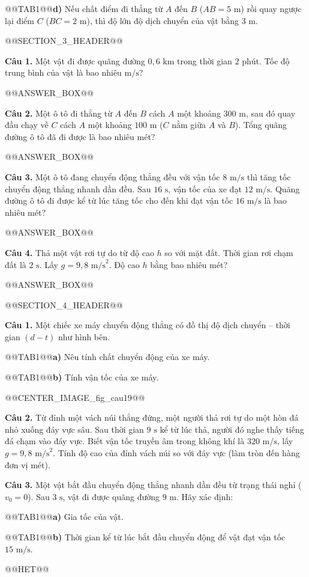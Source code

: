 \documentclass{article}
\begin{document}
@@TAB1@@\textbf{d)} Nếu chất điểm đi thẳng từ $A$ đến $B$ ($AB = 5\text{ m}$) rồi quay ngược lại điểm $C$ ($BC = 2\text{ m}$), thì độ lớn độ dịch chuyển của vật bằng $3\text{ m}$.

@@SECTION_3_HEADER@@

\textbf{Câu 1.} Một vật đi được quãng đường $0{,}6\text{ km}$ trong thời gian $2\text{ phút}$. Tốc độ trung bình của vật là bao nhiêu $\text{m/s}$?

@@ANSWER_BOX@@

\textbf{Câu 2.} Một ô tô đi thẳng từ $A$ đến $B$ cách $A$ một khoảng $300\text{ m}$, sau đó quay đầu chạy về $C$ cách $A$ một khoảng $100\text{ m}$ ($C$ nằm giữa $A$ và $B$). Tổng quãng đường ô tô đã đi được là bao nhiêu mét?

@@ANSWER_BOX@@

\textbf{Câu 3.} Một ô tô đang chuyển động thẳng đều với vận tốc $8\text{ m/s}$ thì tăng tốc chuyển động thẳng nhanh dần đều. Sau $16\text{ s}$, vận tốc của xe đạt $12\text{ m/s}$. Quãng đường ô tô đi được kể từ lúc tăng tốc cho đến khi đạt vận tốc $16\text{ m/s}$ là bao nhiêu mét?

@@ANSWER_BOX@@

\textbf{Câu 4.} Thả một vật rơi tự do từ độ cao $h$ so với mặt đất. Thời gian rơi chạm đất là $2\text{ s}$. Lấy $g = 9{,}8\text{ m/s}^2$. Độ cao $h$ bằng bao nhiêu mét?

@@ANSWER_BOX@@

@@SECTION_4_HEADER@@

\textbf{Câu 1.} Một chiếc xe máy chuyển động thẳng có đồ thị độ dịch chuyển -- thời gian $(d - t)$ như hình bên.

@@TAB1@@\textbf{a)} Nêu tính chất chuyển động của xe máy.

@@TAB1@@\textbf{b)} Tính vận tốc của xe máy.

@@CENTER_IMAGE_fig_cau19@@

\textbf{Câu 2.} Từ đỉnh một vách núi thẳng đứng, một người thả rơi tự do một hòn đá nhỏ xuống đáy vực sâu. Sau thời gian $9\text{ s}$ kể từ lúc thả, người đó nghe thấy tiếng đá chạm vào đáy vực. Biết vận tốc truyền âm trong không khí là $320\text{ m/s}$, lấy $g = 9{,}8\text{ m/s}^2$. Tính độ cao của đỉnh vách núi so với đáy vực (làm tròn đến hàng đơn vị mét).

\textbf{Câu 3.} Một vật bắt đầu chuyển động thẳng nhanh dần đều từ trạng thái nghỉ ($v_0 = 0$). Sau $3\text{ s}$, vật đi được quãng đường $9\text{ m}$. Hãy xác định:

@@TAB1@@\textbf{a)} Gia tốc của vật.

@@TAB1@@\textbf{b)} Thời gian kể từ lúc bắt đầu chuyển động để vật đạt vận tốc $15\text{ m/s}$.



@@HET@@
\end{document}
